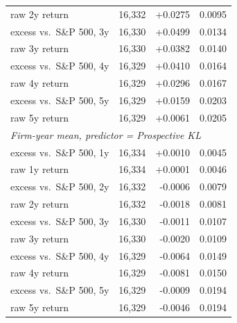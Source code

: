 \begin{tabular}{lrrr}
raw 2y return & 16,332 & +0.0275 & 0.0095 \\
excess vs.\ S\&P 500, 3y & 16,330 & +0.0499 & 0.0134 \\
raw 3y return & 16,330 & +0.0382 & 0.0140 \\
excess vs.\ S\&P 500, 4y & 16,329 & +0.0410 & 0.0164 \\
raw 4y return & 16,329 & +0.0296 & 0.0167 \\
excess vs.\ S\&P 500, 5y & 16,329 & +0.0159 & 0.0203 \\
raw 5y return & 16,329 & +0.0061 & 0.0205 \\
\midrule
\multicolumn{4}{l}{\textit{Firm-year mean, predictor = Prospective KL}} \\
\midrule
excess vs.\ S\&P 500, 1y & 16,334 & +0.0010 & 0.0045 \\
raw 1y return & 16,334 & +0.0001 & 0.0046 \\
excess vs.\ S\&P 500, 2y & 16,332 & -0.0006 & 0.0079 \\
raw 2y return & 16,332 & -0.0018 & 0.0081 \\
excess vs.\ S\&P 500, 3y & 16,330 & -0.0011 & 0.0107 \\
raw 3y return & 16,330 & -0.0020 & 0.0109 \\
excess vs.\ S\&P 500, 4y & 16,329 & -0.0064 & 0.0149 \\
raw 4y return & 16,329 & -0.0081 & 0.0150 \\
excess vs.\ S\&P 500, 5y & 16,329 & -0.0009 & 0.0194 \\
raw 5y return & 16,329 & -0.0046 & 0.0194 \\
\bottomrule
\end{tabular}
